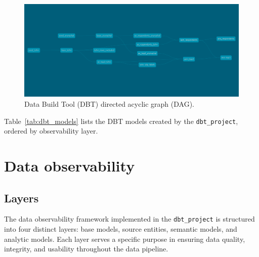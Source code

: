 \documentclass{article}
\begin{document}
\begin{figure}[ht]
\centering
\includegraphics[width=\textwidth]{img/dbt-dag.png}
\caption{Data Build Tool (DBT) directed acyclic graph (DAG).}
\label{fig:dbtdag}
\end{figure}

Table~\ref{tab:dbt_models} lists the DBT models created by the \texttt{dbt\_project}, ordered by observability layer. 



\section{Data observability}

\subsection{Layers}

The data observability framework implemented in the \texttt{dbt\_project} is structured into four distinct layers: base models, source entities, semantic models, and analytic models. Each layer serves a specific purpose in ensuring data quality, integrity, and usability throughout the data pipeline.
\end{document}
